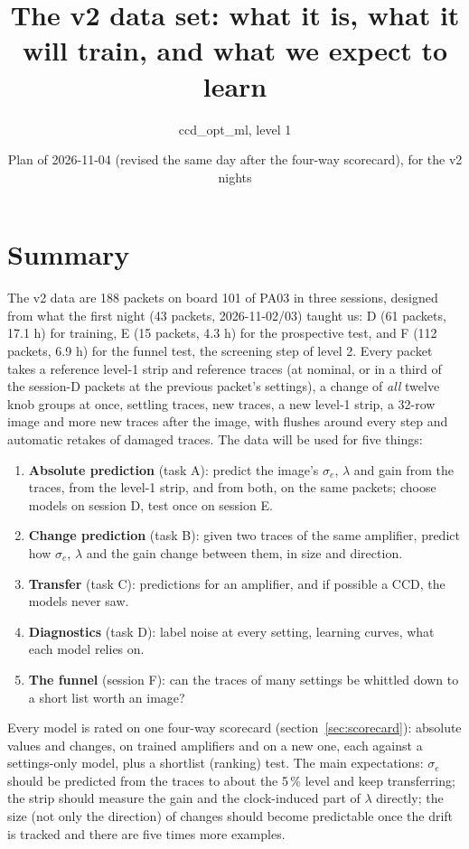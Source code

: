 \documentclass[11pt]{article}
\title{The v2 data set: what it is, what it will train, and what we expect to learn}
\author{ccd\_opt\_ml, level 1}
\date{Plan of 2026-11-04 (revised the same day after the four-way scorecard), for the v2 nights}
\begin{document}
\maketitle

\section*{Summary}
The v2 data are 188 packets on board 101 of PA03 in three sessions, designed from what the first night (43 packets,
2026-11-02/03) taught us: D (61 packets, 17.1 h) for training, E (15 packets, 4.3 h) for the prospective test, and F
(112 packets, 6.9 h) for the funnel test, the screening step of level 2. Every packet takes a reference level-1 strip and reference traces (at nominal, or in a third of the
session-D packets at the previous packet's settings), a change of \emph{all} twelve knob groups at once, settling traces,
new traces, a new level-1 strip, a 32-row image and more new traces after the image, with flushes around every step and
automatic retakes of damaged traces. The data will be used for five things:
\begin{enumerate}
\item \textbf{Absolute prediction} (task A): predict the image's $\sigma_e$, $\lambda$ and gain from the traces, from the
  level-1 strip, and from both, on the same packets; choose models on session D, test once on session E.
\item \textbf{Change prediction} (task B): given two traces of the same amplifier, predict how $\sigma_e$, $\lambda$ and
  the gain change between them, in size and direction.
\item \textbf{Transfer} (task C): predictions for an amplifier, and if possible a CCD, the models never saw.
\item \textbf{Diagnostics} (task D): label noise at every setting, learning curves, what each model relies on.
\item \textbf{The funnel} (session F): can the traces of many settings be whittled down to a short list worth an image?
\end{enumerate}
Every model is rated on one four-way scorecard (section~\ref{sec:scorecard}): absolute values and changes, on trained
amplifiers and on a new one, each against a settings-only model, plus a shortlist (ranking) test.
The main expectations: $\sigma_e$ should be predicted from the traces to about the 5\,\% level and keep transferring;
the strip should measure the gain and the clock-induced part of $\lambda$ directly; the size (not only the direction) of
changes should become predictable once the drift is tracked and there are five times more examples.
\end{document}
